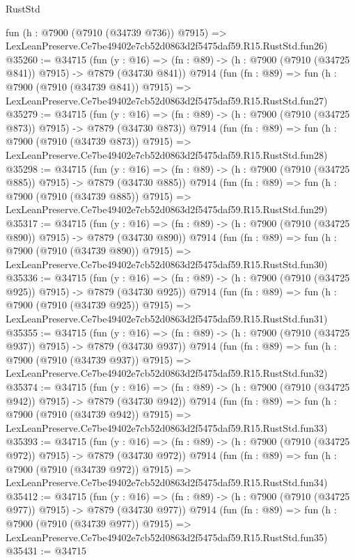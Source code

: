 \begin{lexlean}{RustStd}
\begin{coremodule}
    fun (h : @7900 (@7910 (@34739 @736)) @7915) =>
    LexLeanPreserve.Ce7be49402e7cb52d0863d2f5475daf59.R15.RustStd.fun26)
@35260 := @34715
    (fun (y : @16) => (fn : @89) -> (h : @7900 (@7910 (@34725 @841)) @7915) -> @7879 (@34730 @841))
    @7914
    (fun (fn : @89) =>
    fun (h : @7900 (@7910 (@34739 @841)) @7915) =>
    LexLeanPreserve.Ce7be49402e7cb52d0863d2f5475daf59.R15.RustStd.fun27)
@35279 := @34715
    (fun (y : @16) => (fn : @89) -> (h : @7900 (@7910 (@34725 @873)) @7915) -> @7879 (@34730 @873))
    @7914
    (fun (fn : @89) =>
    fun (h : @7900 (@7910 (@34739 @873)) @7915) =>
    LexLeanPreserve.Ce7be49402e7cb52d0863d2f5475daf59.R15.RustStd.fun28)
@35298 := @34715
    (fun (y : @16) => (fn : @89) -> (h : @7900 (@7910 (@34725 @885)) @7915) -> @7879 (@34730 @885))
    @7914
    (fun (fn : @89) =>
    fun (h : @7900 (@7910 (@34739 @885)) @7915) =>
    LexLeanPreserve.Ce7be49402e7cb52d0863d2f5475daf59.R15.RustStd.fun29)
@35317 := @34715
    (fun (y : @16) => (fn : @89) -> (h : @7900 (@7910 (@34725 @890)) @7915) -> @7879 (@34730 @890))
    @7914
    (fun (fn : @89) =>
    fun (h : @7900 (@7910 (@34739 @890)) @7915) =>
    LexLeanPreserve.Ce7be49402e7cb52d0863d2f5475daf59.R15.RustStd.fun30)
@35336 := @34715
    (fun (y : @16) => (fn : @89) -> (h : @7900 (@7910 (@34725 @925)) @7915) -> @7879 (@34730 @925))
    @7914
    (fun (fn : @89) =>
    fun (h : @7900 (@7910 (@34739 @925)) @7915) =>
    LexLeanPreserve.Ce7be49402e7cb52d0863d2f5475daf59.R15.RustStd.fun31)
@35355 := @34715
    (fun (y : @16) => (fn : @89) -> (h : @7900 (@7910 (@34725 @937)) @7915) -> @7879 (@34730 @937))
    @7914
    (fun (fn : @89) =>
    fun (h : @7900 (@7910 (@34739 @937)) @7915) =>
    LexLeanPreserve.Ce7be49402e7cb52d0863d2f5475daf59.R15.RustStd.fun32)
@35374 := @34715
    (fun (y : @16) => (fn : @89) -> (h : @7900 (@7910 (@34725 @942)) @7915) -> @7879 (@34730 @942))
    @7914
    (fun (fn : @89) =>
    fun (h : @7900 (@7910 (@34739 @942)) @7915) =>
    LexLeanPreserve.Ce7be49402e7cb52d0863d2f5475daf59.R15.RustStd.fun33)
@35393 := @34715
    (fun (y : @16) => (fn : @89) -> (h : @7900 (@7910 (@34725 @972)) @7915) -> @7879 (@34730 @972))
    @7914
    (fun (fn : @89) =>
    fun (h : @7900 (@7910 (@34739 @972)) @7915) =>
    LexLeanPreserve.Ce7be49402e7cb52d0863d2f5475daf59.R15.RustStd.fun34)
@35412 := @34715
    (fun (y : @16) => (fn : @89) -> (h : @7900 (@7910 (@34725 @977)) @7915) -> @7879 (@34730 @977))
    @7914
    (fun (fn : @89) =>
    fun (h : @7900 (@7910 (@34739 @977)) @7915) =>
    LexLeanPreserve.Ce7be49402e7cb52d0863d2f5475daf59.R15.RustStd.fun35)
@35431 := @34715

\end{coremodule}
\end{lexlean}
